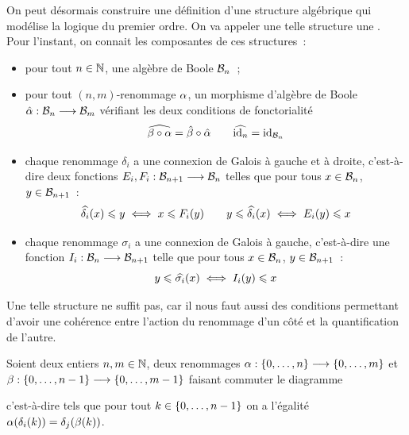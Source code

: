 \begin{problem}
  On peut désormais construire une définition d'une structure algébrique qui
  modélise la logique du premier ordre. On va appeler une telle structure
  une . Pour l'instant, on connait les composantes de
  ces structures~:
  \begin{itemize}
  \item pour tout $n \in \mathbb N$, une algèbre de Boole $\mathcal{B}_n$~;
  \item pour tout $(n,m)$-renommage $\alpha$, un morphisme d'algèbre de Boole
    $\hat{\alpha} : \displaystyle \mathcal{B}_n \longrightarrow \mathcal{B}_m$ vérifiant les deux
    conditions de fonctorialité
    \[\widehat{\beta\circ\alpha} = \hat{\beta}\circ\hat{\alpha}
    \qquad \widehat{\operatorname{id}_n} = \operatorname{id}_{\mathcal{B}_n}\]
  \item chaque renommage $\delta_i$ a une connexion de Galois à gauche et à
    droite, c'est-à-dire deux fonctions
    $E_i,F_i : \displaystyle \mathcal{B}_{n+1} \longrightarrow \mathcal{B}_n$ telles que pour tous
    $x \in \mathcal{B}_n$, $y \in \mathcal{B}_{n+1}$~:
    \[\widehat{\delta_i}(x)\leqslant y \iff x \leqslant F_i(y)\qquad
    y\leqslant \widehat{\delta_i}(x) \iff E_i(y) \leqslant x\]
  \item chaque renommage $\sigma_i$ a une connexion de Galois à gauche,
    c'est-à-dire une fonction $I_i : \displaystyle \mathcal{B}_n \longrightarrow \mathcal{B}_{n+1}$ telle
    que pour tous $x \in \mathcal{B}_n$, $y \in \mathcal{B}_{n+1}$~:
    \[y \leqslant \widehat{\sigma_i}(x) \iff I_i(y) \leqslant x\]
  \end{itemize}
  Une telle structure ne suffit pas, car il nous faut aussi des conditions
  permettant d'avoir une cohérence entre l'action du renommage d'un côté et
  la quantification de l'autre.
  \begin{pbQuest}
  \item Soient deux entiers $n,m\in\mathbb N$, deux renommages
    $\alpha : \displaystyle \{0,\ldots,n\} \longrightarrow \{0,\ldots,m\}$ et
    $\beta : \displaystyle \{0,\ldots,n - 1\} \longrightarrow \{0,\ldots,m - 1\}$ faisant
    commuter le diagramme
    \begin{center}
    \end{center}
    c'est-à-dire tels que pour tout $k \in \{0,\ldots,n - 1\}$ on a l'égalité
    $\alpha(\delta_i(k)) = \delta_j(\beta(k))$.

\end{pbQuest}
\end{problem}
